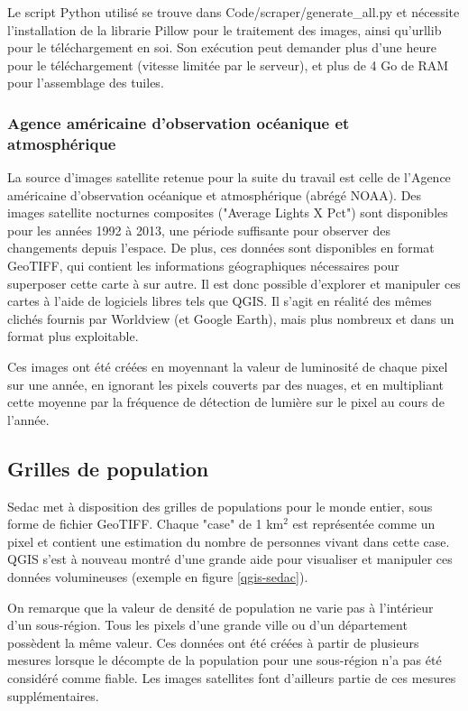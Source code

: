 \documentclass[a4paper, 11pt]{report}
\begin{document}
Le script Python utilisé se trouve dans Code/scraper/generate\_all.py et nécessite l'installation de la librarie Pillow pour le traitement des images, ainsi qu'urllib pour le téléchargement en soi. Son exécution peut demander plus d'une heure pour le téléchargement (vitesse limitée par le serveur), et plus de 4 Go de RAM pour l'assemblage des tuiles.

\subsubsection{Agence américaine d'observation océanique et atmosphérique}
La source d'images satellite retenue pour la suite du travail est celle de l'Agence américaine d'observation océanique et atmosphérique (abrégé NOAA)\cite{noaa}. Des images satellite nocturnes composites ("Average Lights X Pct") sont disponibles pour les années 1992 à 2013, une période suffisante pour observer des changements depuis l'espace. De plus, ces données sont disponibles en format GeoTIFF, qui contient les informations géographiques nécessaires pour superposer cette carte à sur autre. Il est donc possible d'explorer et manipuler ces cartes à l'aide de logiciels libres tels que QGIS. Il s'agit en réalité des mêmes clichés fournis par Worldview (et Google Earth), mais plus nombreux et dans un format plus exploitable.

Ces images ont été créées en moyennant la valeur de luminosité de chaque pixel sur une année, en ignorant les pixels couverts par des nuages, et en multipliant cette moyenne par la fréquence de détection de lumière sur le pixel au cours de l'année.

\subsection{Grilles de population}
Sedac \cite{sedac} met à disposition des grilles de populations pour le monde entier, sous forme de fichier GeoTIFF. Chaque "case" de 1 km$^2$ est représentée comme un pixel et contient une estimation du nombre de personnes vivant dans cette case. QGIS s'est à nouveau montré d'une grande aide pour visualiser et manipuler ces données volumineuses (exemple en figure \ref{qgis-sedac}).

On remarque que la valeur de densité de population ne varie pas à l'intérieur d'un sous-région. Tous les pixels d'une grande ville ou d'un département possèdent la même valeur. Ces données ont été créées à partir de plusieurs mesures lorsque le décompte de la population pour une sous-région n'a pas été considéré comme fiable. Les images satellites font d'ailleurs partie de ces mesures supplémentaires.
\end{document}
